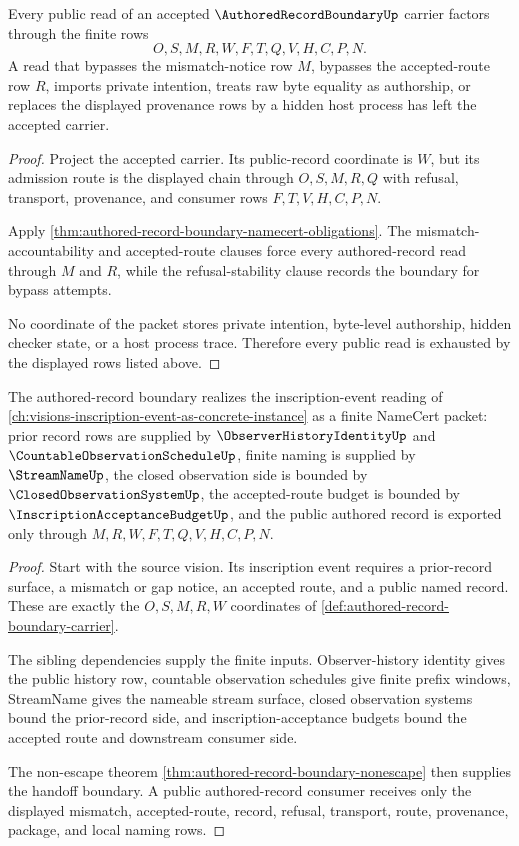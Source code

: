 \begin{theorem}
\label{thm:authored-record-boundary-nonescape}
Every public read of an accepted $\AuthoredRecordBoundaryUp$ carrier factors through the finite rows
$$
O,S,M,R,W,F,T,Q,V,H,C,P,N.
$$
A read that bypasses the mismatch-notice row $M$, bypasses the accepted-route row $R$, imports private intention, treats raw byte equality as authorship, or replaces the displayed provenance rows by a hidden host process has left the accepted carrier.
\end{theorem}
\begin{proof}
Project the accepted carrier. Its public-record coordinate is $W$, but its admission route is the displayed chain through $O,S,M,R,Q$ with refusal, transport, provenance, and consumer rows $F,T,V,H,C,P,N$.

Apply \autoref{thm:authored-record-boundary-namecert-obligations}. The mismatch-accountability and accepted-route clauses force every authored-record read through $M$ and $R$, while the refusal-stability clause records the boundary for bypass attempts.

No coordinate of the packet stores private intention, byte-level authorship, hidden checker state, or a host process trace. Therefore every public read is exhausted by the displayed rows listed above.
\end{proof}

\begin{theorem}
\label{thm:authored-record-boundary-vision-handoff}
The authored-record boundary realizes the inscription-event reading of \autoref{ch:visions-inscription-event-as-concrete-instance} as a finite NameCert packet: prior record rows are supplied by $\ObserverHistoryIdentityUp$ and $\CountableObservationScheduleUp$, finite naming is supplied by $\StreamNameUp$, the closed observation side is bounded by $\ClosedObservationSystemUp$, the accepted-route budget is bounded by $\InscriptionAcceptanceBudgetUp$, and the public authored record is exported only through $M,R,W,F,T,Q,V,H,C,P,N$.
\end{theorem}
\begin{proof}
Start with the source vision. Its inscription event requires a prior-record surface, a mismatch or gap notice, an accepted route, and a public named record. These are exactly the $O,S,M,R,W$ coordinates of \autoref{def:authored-record-boundary-carrier}.

The sibling dependencies supply the finite inputs. Observer-history identity gives the public history row, countable observation schedules give finite prefix windows, StreamName gives the nameable stream surface, closed observation systems bound the prior-record side, and inscription-acceptance budgets bound the accepted route and downstream consumer side.

The non-escape theorem \autoref{thm:authored-record-boundary-nonescape} then supplies the handoff boundary. A public authored-record consumer receives only the displayed mismatch, accepted-route, record, refusal, transport, route, provenance, package, and local naming rows.
\end{proof}

